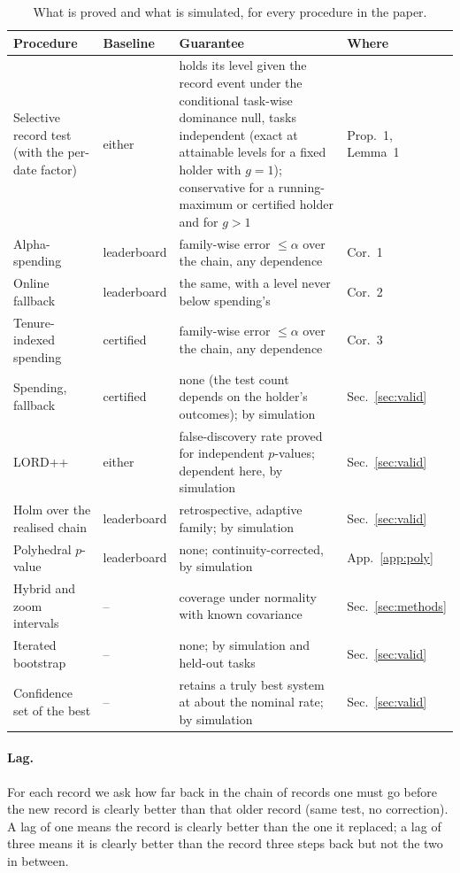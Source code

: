 \documentclass[11pt]{article}
\begin{document}
\begin{table}[t]
\centering\small
\begin{tabular}{p{3.6cm}p{2.2cm}p{6.6cm}p{2.2cm}}
\toprule
Procedure & Baseline & Guarantee & Where \\
\midrule
Selective record test (with the per-date factor) & either & holds its level given the record event under the conditional task-wise dominance null, tasks independent (exact at attainable levels for a fixed holder with $g=1$); conservative for a running-maximum or certified holder and for $g>1$ & Prop.~1, Lemma~1 \\
Alpha-spending & leaderboard & family-wise error $\le\alpha$ over the chain, any dependence & Cor.~1 \\
Online fallback & leaderboard & the same, with a level never below spending's & Cor.~2 \\
Tenure-indexed spending & certified & family-wise error $\le\alpha$ over the chain, any dependence & Cor.~3 \\
Spending, fallback & certified & none (the test count depends on the holder's outcomes); by simulation & Sec.~\ref{sec:valid} \\
LORD++ & either & false-discovery rate proved for independent $p$-values; dependent here, by simulation & Sec.~\ref{sec:valid} \\
Holm over the realised chain & leaderboard & retrospective, adaptive family; by simulation & Sec.~\ref{sec:valid} \\
Polyhedral $p$-value & leaderboard & none; continuity-corrected, by simulation & App.~\ref{app:poly} \\
Hybrid and zoom intervals & -- & coverage under normality with known covariance & Sec.~\ref{sec:methods} \\
Iterated bootstrap & -- & none; by simulation and held-out tasks & Sec.~\ref{sec:valid} \\
Confidence set of the best & -- & retains a truly best system at about the nominal rate; by simulation & Sec.~\ref{sec:valid} \\
\bottomrule
\end{tabular}
\caption{What is proved and what is simulated, for every procedure in the paper.}
\label{tab:guarantees}
\end{table}

\paragraph{Lag.}
For each record we ask how far back in the chain of records one must go before the new record is clearly better than that older record (same test, no correction).
A lag of one means the record is clearly better than the one it replaced; a lag of three means it is clearly better than the record three steps back but not the two in between.
\end{document}
